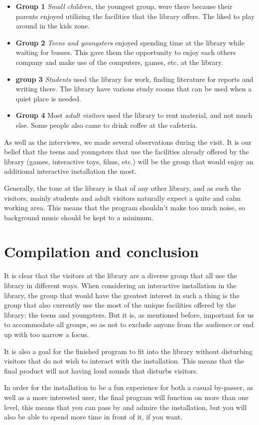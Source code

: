 \begin{itemize}

\item \textbf{Group 1} \textit{Small children}, the youngest group, were there because their parents enjoyed utilizing the facilities that the library offers. The liked to play around in the kids zone.

\item \textbf{Group 2} \textit{Teens and youngsters} enjoyed spending time at the library while waiting for busses. This gave them the opportunity to enjoy each others company and make use of the computers, games, etc. at the library.

\item \textbf{group 3} \textit{Students} used the library for work, finding literature for reports and writing there. The library have various study rooms that can be used when a quiet place is needed.

\item \textbf{Group 4} Most \textit{adult visitors} used the library to rent material, and not much else. Some people also came to drink coffee at the cafeteria.

\end{itemize}

As well as the interviews, we made several observations during the visit. It is our belief that the teens and youngsters that use the facilities already offered by the library (games, interactive toys, films, etc.) will be the group that would enjoy an additional interactive installation the most.

Generally, the tone at the library is that of any other library, and as such the visitors, mainly students and adult visitors naturally expect a quite and calm working area. This means that the program shouldn't make too much noise, so background music should be kept to a minimum.

\section{Compilation and conclusion}

It is clear that the visitors at the library are a diverse group that all use the library in different ways. When considering an interactive installation in the library, the group that would have the greatest interest in such a thing is the group that also currently use the most of the unique facilities offered by the library: the teens and youngsters. But it is, as mentioned before, important for us to accommodate all groups, so as not to exclude anyone from the audience or end up with too narrow a focus.

It is also a goal for the finished program to fit into the library without disturbing visitors that do not wish to interact with the installation. This means that the final product will not having loud sounds that disturbs visitors.

In order for the installation to be a fun experience for both a casual by-passer, as well as a more interested user, the final program will function on more than one level, this means that you can pass by and admire the installation, but you will also be able to spend more time in front of it, if you want.